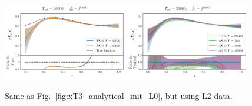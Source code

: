 \begin{figure}[ht!]
\centering
  \includegraphics[width=0.48\textwidth]{plots/analytical_solution/xT3/evolution/from_f0/L2/linear/evolution_epoch_50000_L2_linear.pdf}
  \includegraphics[width=0.48\textwidth]{plots/analytical_solution/xT3/evolution/from_f0/L2/linear/evolution_epochs_700_5000_20000_L2_linear.pdf}
\caption{Same as Fig.~\ref{fig:xT3_analytical_init_L0}, but using L2 data.}
\label{fig:xT3_analytical_init_L2}
\end{figure}

\FloatBarrier








